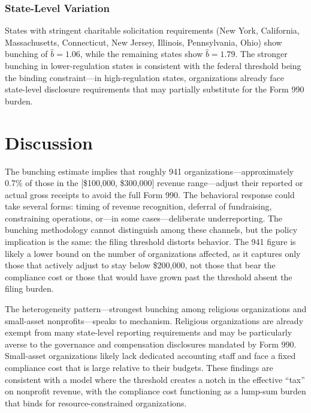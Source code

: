 \documentclass[12pt]{article}
\begin{document}
\subsubsection*{State-Level Variation} States with stringent charitable solicitation requirements (New York, California, Massachusetts, Connecticut, New Jersey, Illinois, Pennsylvania, Ohio) show bunching of $\hat{b} = 1.06$, while the remaining states show $\hat{b} = 1.79$. The stronger bunching in lower-regulation states is consistent with the federal threshold being the binding constraint---in high-regulation states, organizations already face state-level disclosure requirements that may partially substitute for the Form 990 burden.

\section{Discussion}

The bunching estimate implies that roughly 941 organizations---approximately 0.7\% of those in the [\$100,000, \$300,000] revenue range---adjust their reported or actual gross receipts to avoid the full Form 990. The behavioral response could take several forms: timing of revenue recognition, deferral of fundraising, constraining operations, or---in some cases---deliberate underreporting. The bunching methodology cannot distinguish among these channels, but the policy implication is the same: the filing threshold distorts behavior. The 941 figure is likely a lower bound on the number of organizations affected, as it captures only those that actively adjust to stay below \$200,000, not those that bear the compliance cost or those that would have grown past the threshold absent the filing burden.

The heterogeneity pattern---strongest bunching among religious organizations and small-asset nonprofits---speaks to mechanism. Religious organizations are already exempt from many state-level reporting requirements and may be particularly averse to the governance and compensation disclosures mandated by Form 990. Small-asset organizations likely lack dedicated accounting staff and face a fixed compliance cost that is large relative to their budgets. These findings are consistent with a model where the threshold creates a notch in the effective ``tax'' on nonprofit revenue, with the compliance cost functioning as a lump-sum burden that binds for resource-constrained organizations.
\end{document}

